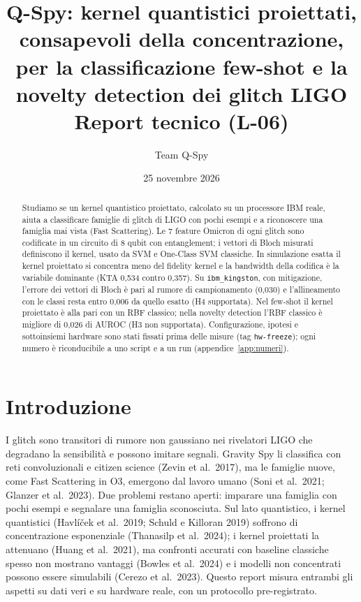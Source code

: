 \documentclass[11pt,a4paper]{article}
\title{\textbf{Q-Spy}: kernel quantistici proiettati, consapevoli della concentrazione,\\
per la classificazione few-shot e la novelty detection dei glitch LIGO\\[4pt]\large Report tecnico (L-06)}
\author{Team Q-Spy}
\date{25 novembre 2026}
\begin{document}
\maketitle

\begin{abstract}
\noindent Studiamo se un kernel quantistico proiettato, calcolato su un processore IBM reale, aiuta a classificare
famiglie di glitch di LIGO con pochi esempi e a riconoscere una famiglia mai vista (Fast Scattering). Le 7 feature
Omicron di ogni glitch sono codificate in un circuito di 8 qubit con entanglement; i vettori di Bloch misurati
definiscono il kernel, usato da SVM e One-Class SVM classiche. In simulazione esatta il kernel proiettato si concentra
meno del fidelity kernel e la bandwidth della codifica è la variabile dominante (KTA 0,534 contro 0,357). Su
\texttt{ibm\_kingston}, con mitigazione, l’errore dei vettori di Bloch è pari al rumore di campionamento (0,030) e
l’allineamento con le classi resta entro 0,006 da quello esatto (H4 supportata). Nel few-shot il kernel proiettato è
alla pari con un RBF classico; nella novelty detection l’RBF classico è migliore di 0,026 di AUROC (H3 non supportata).
Configurazione, ipotesi e sottoinsiemi hardware sono stati fissati prima delle misure (tag \texttt{hw-freeze}); ogni
numero è riconducibile a uno script e a un run (appendice~\ref{app:numeri}).
\end{abstract}

\section{Introduzione}
I glitch sono transitori di rumore non gaussiano nei rivelatori LIGO che degradano la sensibilità e possono imitare
segnali. Gravity Spy li classifica con reti convoluzionali e citizen science (Zevin et al.\ 2017), ma le famiglie nuove,
come Fast Scattering in O3, emergono dal lavoro umano (Soni et al.\ 2021; Glanzer et al.\ 2023). Due problemi restano
aperti: imparare una famiglia con pochi esempi e segnalare una famiglia sconosciuta. Sul lato quantistico, i kernel
quantistici (Havlíček et al.\ 2019; Schuld e Killoran 2019) soffrono di concentrazione esponenziale (Thanasilp et al.\
2024); i kernel proiettati la attenuano (Huang et al.\ 2021), ma confronti accurati con baseline classiche spesso non
mostrano vantaggi (Bowles et al.\ 2024) e i modelli non concentrati possono essere simulabili (Cerezo et al.\ 2023).
Questo report misura entrambi gli aspetti su dati veri e su hardware reale, con un protocollo pre-registrato.
\end{document}
